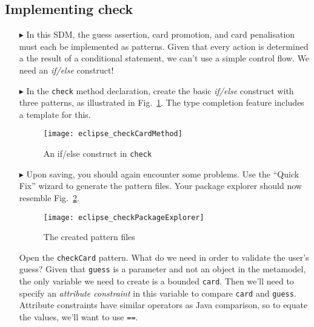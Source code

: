 \newpage
\hypertarget{checkCard tex}{}
\subsection{Implementing check}
\texHeader
 
\begin{itemize}
   
\item[$\blacktriangleright$] In this SDM, the guess assertion, card promotion, and card penalisation must each be implemented as patterns. Given that every
action is determined a the result of a conditional statement, we can't use a simple control flow. We need an \emph{if/else} construct!

\item[$\blacktriangleright$] In the \texttt{check} method declaration, create the basic \emph{if/else} construct with three patterns, as illustrated in
Fig.~\ref{fig:checkDec}. The type completion feature includes a template for this.

\vspace{0.5cm}

\begin{figure}[htbp]
\begin{center}
  \texttt{[image: eclipse\_checkCardMethod]}
  \caption{An if/else construct in \texttt{check}}
  \label{fig:checkDec}
\end{center}
\end{figure} 

\item[$\blacktriangleright$] Upon saving, you should again encounter some problems. Use the ``Quick Fix'' wizard to generate the pattern files. Your package
explorer should now resemble Fig.~\ref{fig:checkPatternsExplorer}.

\begin{figure}[htbp]
\begin{center}
  \texttt{[image: eclipse\_checkPackageExplorer]}
  \caption{The created pattern files}
  \label{fig:checkPatternsExplorer}
\end{center}
\end{figure} 

\vspace{0.5cm}

Open the \texttt{checkCard} pattern. What do we need in order to validate the user's guess? Given that \texttt{guess} is a parameter and not an object in the
metamodel, the only variable we need to create is a bounded \texttt{card}. Then we'll need to specify an \emph{attribute constraint} in this variable to compare
\texttt{card} and \texttt{guess}. Attribute constraints have similar operators as Java comparison, so to equate the values, we'll want to use \texttt{==}.


\end{itemize}
